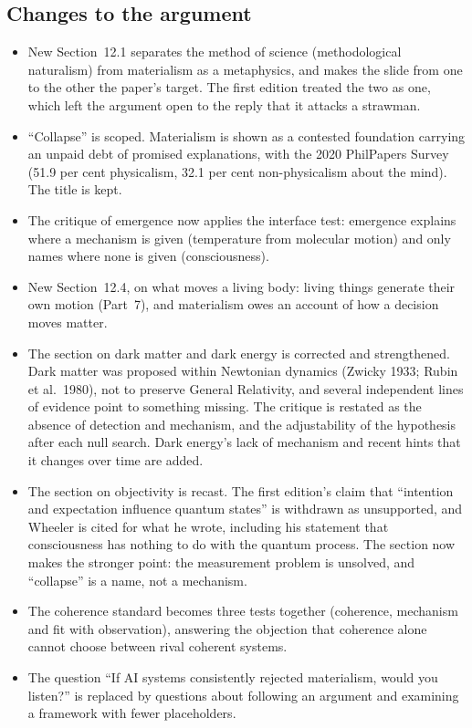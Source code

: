 \documentclass[11pt,a4paper]{article}
\begin{document}
\subsection*{Changes to the argument}
\begin{itemize}
  \item New Section~12.1 separates the method of science (methodological naturalism) from materialism as a metaphysics, and makes the slide from one to the other the paper's target. The first edition treated the two as one, which left the argument open to the reply that it attacks a strawman.
  \item ``Collapse'' is scoped. Materialism is shown as a contested foundation carrying an unpaid debt of promised explanations, with the 2020 PhilPapers Survey (51.9 per cent physicalism, 32.1 per cent non-physicalism about the mind). The title is kept.
  \item The critique of emergence now applies the interface test: emergence explains where a mechanism is given (temperature from molecular motion) and only names where none is given (consciousness).
  \item New Section~12.4, on what moves a living body: living things generate their own motion (Part~7), and materialism owes an account of how a decision moves matter.
  \item The section on dark matter and dark energy is corrected and strengthened. Dark matter was proposed within Newtonian dynamics (Zwicky 1933; Rubin et al.\ 1980), not to preserve General Relativity, and several independent lines of evidence point to something missing. The critique is restated as the absence of detection and mechanism, and the adjustability of the hypothesis after each null search. Dark energy's lack of mechanism and recent hints that it changes over time are added.
  \item The section on objectivity is recast. The first edition's claim that ``intention and expectation influence quantum states'' is withdrawn as unsupported, and Wheeler is cited for what he wrote, including his statement that consciousness has nothing to do with the quantum process. The section now makes the stronger point: the measurement problem is unsolved, and ``collapse'' is a name, not a mechanism.
  \item The coherence standard becomes three tests together (coherence, mechanism and fit with observation), answering the objection that coherence alone cannot choose between rival coherent systems.
  \item The question ``If AI systems consistently rejected materialism, would you listen?'' is replaced by questions about following an argument and examining a framework with fewer placeholders.
\end{itemize}
\end{document}
